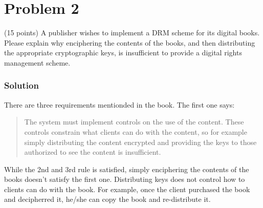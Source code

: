 \section*{Problem 2}
(15 points) A publisher wishes to implement a DRM scheme for its digital books. 
Please explain why enciphering the contents of the books, and then distributing the appropriate cryptographic keys, is insufficient to provide a digital rights management scheme.

\subsubsection*{Solution}

There are three requirements mentionded in the book. 
The first one says:

\begin{quotation}
    The system must implement controls on the use of the content. 
    These controls constrain what clients can do with the content, so for example simply distributing the content encrypted and providing the keys to those authorized to see the content is insufficient.
\end{quotation}

While the 2nd and 3rd rule is satisfied, simply enciphering the contents of the books doesn't satisfy the first one.
Distributing keys does not control how to clients can do with the book.
For example, once the client purchased the book and decipherred it, he/she can copy the book and re-distribute it.

